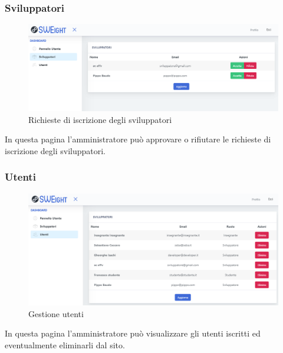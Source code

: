 		\subsubsection{Sviluppatori}
			\begin{figure}[H]
				\centering
				\includegraphics[width=17cm]{sez/img/amministratore/conf_ric_svil.PNG}
				\caption{Richieste di iscrizione degli sviluppatori}\label{fig:1}
			\end{figure}
		  In questa pagina l'amministratore può approvare o rifiutare le richieste di iscrizione degli sviluppatori.


		\subsubsection{Utenti}
			\begin{figure}[H]
				\centering
				\includegraphics[width=17cm]{sez/img/amministratore/gestisciutenti.PNG}
				\caption{Gestione utenti}\label{fig:1}
			\end{figure}
		  In questa pagina l'amministratore può visualizzare gli utenti iscritti ed eventualmente eliminarli dal sito.

